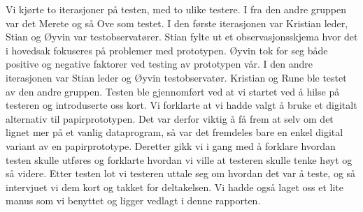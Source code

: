 Vi kjørte to iterasjoner på testen, med to ulike testere. I fra den andre
gruppen var det Merete og så Ove som testet. I  den første iterasjonen var
Kristian leder, Stian og Øyvin var testobservatører. Stian fylte ut et observasjonsskjema hvor det i hovedsak fokuseres på problemer med prototypen. Øyvin tok for seg både positive og negative faktorer ved testing av prototypen vår. I den andre iterasjonen var
Stian leder og Øyvin testobservatør. Kristian og Rune ble testet av den andre
gruppen. Testen ble gjennomført ved at vi startet ved  å hilse på testeren og introduserte oss
kort. Vi forklarte at vi hadde valgt å bruke et digitalt alternativ til papirprototypen. Det var derfor viktig å få frem at selv om det lignet mer på et vanlig dataprogram, så var det fremdeles bare en enkel digital variant av en papirprototype. Deretter gikk vi i gang med å forklare hvordan testen skulle utføres og forklarte hvordan vi ville at testeren skulle tenke høyt og så videre. Etter testen lot vi testeren uttale seg om hvordan det var å teste, og så intervjuet vi dem kort og takket for deltakelsen. 
Vi hadde også laget oss et lite manus som vi benyttet og ligger vedlagt i denne rapporten.


